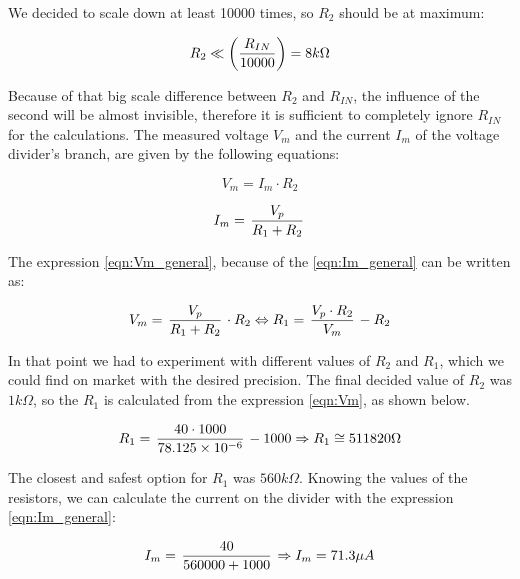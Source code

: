 We decided to scale down at least 10000 times, so $R_2$ should be at maximum:

\begin{equation}
R_2 \ll \left( R_{IN} \over 10000 \right) = 8k\Omega
\label{eqn:maximum_R2}
\end{equation}

Because of that big scale difference between $R_2$ and $R_{IN}$, the influence of the second will be almost invisible, therefore it is sufficient to completely ignore $R_{IN}$ for the calculations. The measured voltage $V_m$ and the current $I_m$ of the voltage divider's branch, are given by the following equations:

\begin{equation}
V_m = I_m \cdot R_2
\label{eqn:Vm_general}
\end{equation}

\begin{equation}
I_m = \left. V_p \over R_1 + R_2 \right.
\label{eqn:Im_general}
\end{equation}

The expression \ref{eqn:Vm_general}, because of the \ref{eqn:Im_general} can be written as:

\begin{equation}
V_m = \left. V_p \over R_1 + R_2 \right. \cdot R_2 \Leftrightarrow R_1 = \left. V_p \cdot R_2 \over V_m \right. - R_2
\label{eqn:Vm}
\end{equation}

In that point we had to experiment with different values of $R_2$ and $R_1$, which we could find on market with the desired precision. The final decided value of $R_2$ was $1k\Omega$, so the $R_1$ is calculated from the expression \ref{eqn:Vm}, as shown below. 

\begin{equation}
R_1 = \left. 40 \cdot 1000 \over 78.125 \times 10^{-6} \right. - 1000 \Rightarrow R_1 \cong 511820\Omega
\label{eqn:R1_calculation}
\end{equation}

The closest and safest option for $R_1$ was $560k\Omega$. Knowing the values of the resistors, we can
calculate the current on the divider with the expression \ref{eqn:Im_general}:

\begin{equation}
I_m = \left. 40 \over 560000 + 1000 \right. \Rightarrow I_m = 71.3\mu A
\label{eqn:Im_calculation}
\end{equation}

